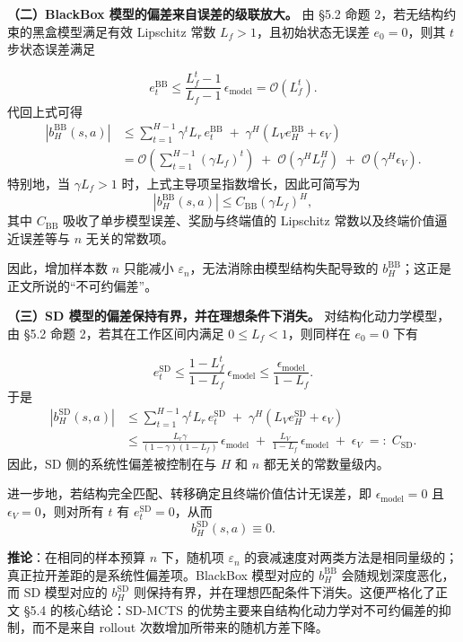 \documentclass[UTF8]{ctexart}
\begin{document}
\textbf{（二）BlackBox 模型的偏差来自误差的级联放大。} 由 §5.2 命题 2，若无结构约束的黑盒模型满足有效 Lipschitz 常数 \(L_f>1\)，且初始状态无误差 \(e_0=0\)，则其 \(t\) 步状态误差满足

\[
e_t^{\mathrm{BB}}
\le
\frac{L_f^t-1}{L_f-1}\,\epsilon_{\text{model}}
=
\mathcal O(L_f^t).
\]
代回上式可得
\[
\begin{aligned}
|b_H^{\mathrm{BB}}(s,a)|
&\le
\sum_{t=1}^{H-1}\gamma^t L_r\, e_t^{\mathrm{BB}}
\;+\;
\gamma^H\!\left(L_V e_H^{\mathrm{BB}}+\epsilon_V\right) \\
&=
\mathcal O\!\left(\sum_{t=1}^{H-1}(\gamma L_f)^t\right)
\;+\;
\mathcal O\!\left(\gamma^H L_f^H\right)
\;+\;
\mathcal O(\gamma^H\epsilon_V).
\end{aligned}
\]
特别地，当 \(\gamma L_f>1\) 时，上式主导项呈指数增长，因此可简写为
\[
\left|b_H^{\mathrm{BB}}(s,a)\right|
\le
C_{\mathrm{BB}}(\gamma L_f)^H,
\]
其中 \(C_{\mathrm{BB}}\) 吸收了单步模型误差、奖励与终端值的 Lipschitz 常数以及终端价值逼近误差等与 \(n\) 无关的常数项。

因此，增加样本数 \(n\) 只能减小 \(\varepsilon_n\)，无法消除由模型结构失配导致的 \(b_H^{\mathrm{BB}}\)；这正是正文所说的“不可约偏差”。

\textbf{（三）SD 模型的偏差保持有界，并在理想条件下消失。} 对结构化动力学模型，由 §5.2 命题 2，若其在工作区间内满足 \(0\le L_f<1\)，则同样在 \(e_0=0\) 下有

\[
e_t^{\mathrm{SD}}
\le
\frac{1-L_f^t}{1-L_f}\,\epsilon_{\text{model}}
\le
\frac{\epsilon_{\text{model}}}{1-L_f}.
\]
于是
\[
\begin{aligned}
|b_H^{\mathrm{SD}}(s,a)|
&\le
\sum_{t=1}^{H-1}\gamma^t L_r\, e_t^{\mathrm{SD}}
\;+\;
\gamma^H\!\left(L_V e_H^{\mathrm{SD}}+\epsilon_V\right) \\
&\le
\frac{L_r\gamma}{(1-\gamma)(1-L_f)}\,\epsilon_{\text{model}}
\;+\;
\frac{L_V}{1-L_f}\,\epsilon_{\text{model}}
\;+\;
\epsilon_V
\;=:\;
C_{\mathrm{SD}}.
\end{aligned}
\]
因此，SD 侧的系统性偏差被控制在与 \(H\) 和 \(n\) 都无关的常数量级内。

进一步地，若结构完全匹配、转移确定且终端价值估计无误差，即 \(\epsilon_{\text{model}}=0\) 且 \(\epsilon_V=0\)，则对所有 \(t\) 有 \(e_t^{\mathrm{SD}}=0\)，从而
\[
b_H^{\mathrm{SD}}(s,a)\equiv 0.
\]

\textbf{推论}：在相同的样本预算 \(n\) 下，随机项 \(\varepsilon_n\) 的衰减速度对两类方法是相同量级的；真正拉开差距的是系统性偏差项。BlackBox 模型对应的 \(b_H^{\mathrm{BB}}\) 会随规划深度恶化，而 SD 模型对应的 \(b_H^{\mathrm{SD}}\) 则保持有界，并在理想匹配条件下消失。这便严格化了正文 §5.4 的核心结论：SD-MCTS 的优势主要来自结构化动力学对不可约偏差的抑制，而不是来自 rollout 次数增加所带来的随机方差下降。
\end{document}
